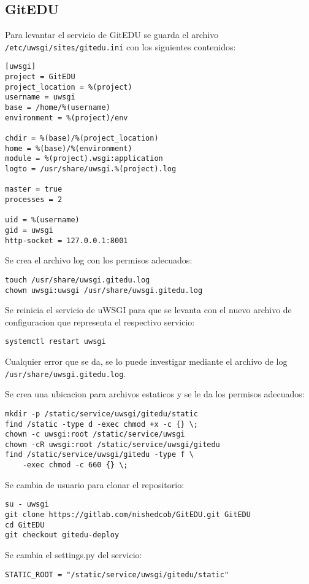 \subsection{GitEDU}
Para levantar el servicio de GitEDU se guarda el archivo \\
\texttt{/etc/uwsgi/sites/gitedu.ini} con los siguientes contenidos:
\begin{lstlisting}
[uwsgi]
project = GitEDU
project_location = %(project)
username = uwsgi
base = /home/%(username)
environment = %(project)/env

chdir = %(base)/%(project_location)
home = %(base)/%(environment)
module = %(project).wsgi:application
logto = /usr/share/uwsgi.%(project).log

master = true
processes = 2

uid = %(username)
gid = uwsgi
http-socket = 127.0.0.1:8001
\end{lstlisting}

Se crea el archivo log con los permisos adecuados:
\begin{lstlisting}
touch /usr/share/uwsgi.gitedu.log
chown uwsgi:uwsgi /usr/share/uwsgi.gitedu.log
\end{lstlisting}

Se reinicia el servicio de uWSGI para que se levanta con el nuevo archivo de configuracion que representa el respectivo servicio:
\begin{lstlisting}
systemctl restart uwsgi
\end{lstlisting}
Cualquier error que se da, se lo puede investigar mediante el archivo de log \\ \texttt{/usr/share/uwsgi.gitedu.log}.

Se crea una ubicacion para archivos estaticos y se le da los permisos adecuados:
\begin{lstlisting}
mkdir -p /static/service/uwsgi/gitedu/static
find /static -type d -exec chmod +x -c {} \;
chown -c uwsgi:root /static/service/uwsgi
chown -cR uwsgi:root /static/service/uwsgi/gitedu
find /static/service/uwsgi/gitedu -type f \
    -exec chmod -c 660 {} \;
\end{lstlisting}

Se cambia de usuario para clonar el repositorio:
\begin{lstlisting}
su - uwsgi
git clone https://gitlab.com/nishedcob/GitEDU.git GitEDU
cd GitEDU
git checkout gitedu-deploy
\end{lstlisting}

Se cambia el settings.py del servicio:
\lstset{language=Python}
\begin{lstlisting}
STATIC_ROOT = "/static/service/uwsgi/gitedu/static"
\end{lstlisting}
\lstset{language=Bash}

